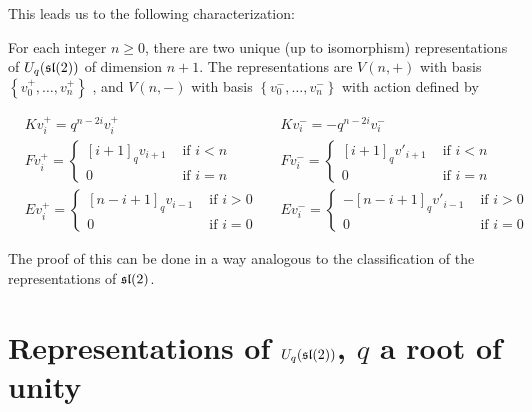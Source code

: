 This leads us to the following characterization:


For each integer $n \geq 0$, there are two unique (up to isomorphism)
representations of $U_q(\mathfrak{sl}(2))$ of dimension $n+1$. 
The representations are $V(n,+)$ with basis $\left\{ v^+_0, \ldots, v^+_n
\right\}$ , and $V(n,-)$ with basis $\left\{ v^-_0, \ldots, v^-_n \right\}$
with action defined by 

\begin{align*}
    &K v^+_i = q^{n-2i} v^+_i  &
    &K v^-_i = -q^{n-2i} v^-_i \\
    &F v^+_i = \begin{cases} [i+1]_qv_{i+1}& \text{ if $i < n$} \\ 0& \text{ if $i = n$} \end{cases} &
    &F v^-_i = \begin{cases} [i+1]_qv'_{i+1}& \text{ if $i < n$} \\ 0& \text{ if $i = n$} \end{cases} \\
    &E v^+_i = \begin{cases} 
                     [n-i+1]_qv_{i-1}& \text{ if $i > 0$} \\ 
                    0& \text{ if $i = 0$} 
             \end{cases} &
    &E v^-_i = \begin{cases} 
                    -[n-i+1]_q v'_{i-1}& \text{ if $i > 0$} \\ 
                    0& \text{ if $i = 0$} 
             \end{cases}
\end{align*}

The proof of this can be done in a way analogous to the classification of the
representations of $\mathfrak{sl}(2)$.

\section{Representations of $U_q(\mathfrak{sl}(2))$, $q$ a root of unity}


